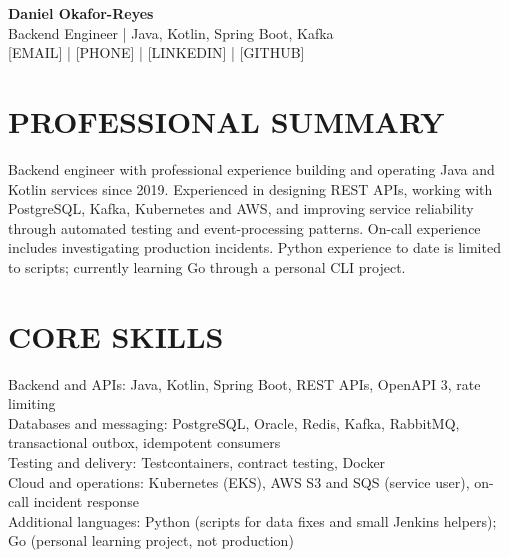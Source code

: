 \documentclass[11pt,a4paper]{article}
\begin{document}
\begin{center}
{\Huge\bfseries\color{primarycolor} Daniel Okafor-Reyes}\\
{\large\color{accentcolor} Backend Engineer | Java, Kotlin, Spring Boot, Kafka}\\[0.3em]
[EMAIL] | [PHONE] | [LINKEDIN] | [GITHUB]
\end{center}

\section*{PROFESSIONAL SUMMARY}
Backend engineer with professional experience building and operating Java and Kotlin services since 2019. Experienced in designing REST APIs, working with PostgreSQL, Kafka, Kubernetes and AWS, and improving service reliability through automated testing and event-processing patterns. On-call experience includes investigating production incidents. Python experience to date is limited to scripts; currently learning Go through a personal CLI project.

\section*{CORE SKILLS}
Backend and APIs: Java, Kotlin, Spring Boot, REST APIs, OpenAPI 3, rate limiting\\
Databases and messaging: PostgreSQL, Oracle, Redis, Kafka, RabbitMQ, transactional outbox, idempotent consumers\\
Testing and delivery: Testcontainers, contract testing, Docker\\
Cloud and operations: Kubernetes (EKS), AWS S3 and SQS (service user), on-call incident response\\
Additional languages: Python (scripts for data fixes and small Jenkins helpers); Go (personal learning project, not production)
\end{document}
